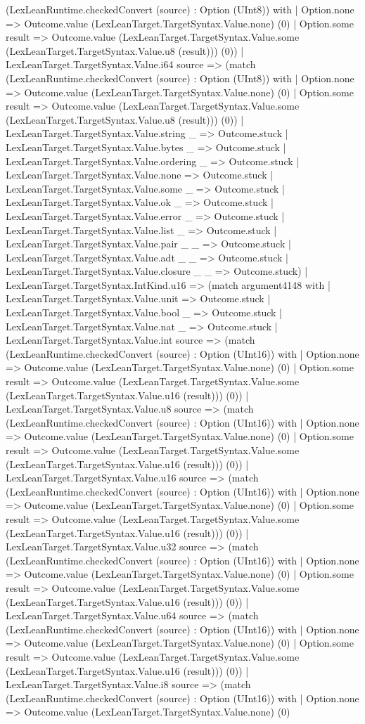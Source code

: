 \documentclass[11pt]{article}
\begin{document}
(LexLeanRuntime.checkedConvert (source) : Option (UInt8)) with | Option.none => Outcome.value (LexLeanTarget.TargetSyntax.Value.none) (0) | Option.some result => Outcome.value (LexLeanTarget.TargetSyntax.Value.some (LexLeanTarget.TargetSyntax.Value.u8 (result))) (0)) | LexLeanTarget.TargetSyntax.Value.i64 source => (match (LexLeanRuntime.checkedConvert (source) : Option (UInt8)) with | Option.none => Outcome.value (LexLeanTarget.TargetSyntax.Value.none) (0) | Option.some result => Outcome.value (LexLeanTarget.TargetSyntax.Value.some (LexLeanTarget.TargetSyntax.Value.u8 (result))) (0)) | LexLeanTarget.TargetSyntax.Value.string \_ => Outcome.stuck | LexLeanTarget.TargetSyntax.Value.bytes \_ => Outcome.stuck | LexLeanTarget.TargetSyntax.Value.ordering \_ => Outcome.stuck | LexLeanTarget.TargetSyntax.Value.none => Outcome.stuck | LexLeanTarget.TargetSyntax.Value.some \_ => Outcome.stuck | LexLeanTarget.TargetSyntax.Value.ok \_ => Outcome.stuck | LexLeanTarget.TargetSyntax.Value.error \_ => Outcome.stuck | LexLeanTarget.TargetSyntax.Value.list \_ => Outcome.stuck | LexLeanTarget.TargetSyntax.Value.pair \_ \_ => Outcome.stuck | LexLeanTarget.TargetSyntax.Value.adt \_ \_ => Outcome.stuck | LexLeanTarget.TargetSyntax.Value.closure \_ \_ => Outcome.stuck) | LexLeanTarget.TargetSyntax.IntKind.u16 => (match argument4148 with | LexLeanTarget.TargetSyntax.Value.unit => Outcome.stuck | LexLeanTarget.TargetSyntax.Value.bool \_ => Outcome.stuck | LexLeanTarget.TargetSyntax.Value.nat \_ => Outcome.stuck | LexLeanTarget.TargetSyntax.Value.int source => (match (LexLeanRuntime.checkedConvert (source) : Option (UInt16)) with | Option.none => Outcome.value (LexLeanTarget.TargetSyntax.Value.none) (0) | Option.some result => Outcome.value (LexLeanTarget.TargetSyntax.Value.some (LexLeanTarget.TargetSyntax.Value.u16 (result))) (0)) | LexLeanTarget.TargetSyntax.Value.u8 source => (match (LexLeanRuntime.checkedConvert (source) : Option (UInt16)) with | Option.none => Outcome.value (LexLeanTarget.TargetSyntax.Value.none) (0) | Option.some result => Outcome.value (LexLeanTarget.TargetSyntax.Value.some (LexLeanTarget.TargetSyntax.Value.u16 (result))) (0)) | LexLeanTarget.TargetSyntax.Value.u16 source => (match (LexLeanRuntime.checkedConvert (source) : Option (UInt16)) with | Option.none => Outcome.value (LexLeanTarget.TargetSyntax.Value.none) (0) | Option.some result => Outcome.value (LexLeanTarget.TargetSyntax.Value.some (LexLeanTarget.TargetSyntax.Value.u16 (result))) (0)) | LexLeanTarget.TargetSyntax.Value.u32 source => (match (LexLeanRuntime.checkedConvert (source) : Option (UInt16)) with | Option.none => Outcome.value (LexLeanTarget.TargetSyntax.Value.none) (0) | Option.some result => Outcome.value (LexLeanTarget.TargetSyntax.Value.some (LexLeanTarget.TargetSyntax.Value.u16 (result))) (0)) | LexLeanTarget.TargetSyntax.Value.u64 source => (match (LexLeanRuntime.checkedConvert (source) : Option (UInt16)) with | Option.none => Outcome.value (LexLeanTarget.TargetSyntax.Value.none) (0) | Option.some result => Outcome.value (LexLeanTarget.TargetSyntax.Value.some (LexLeanTarget.TargetSyntax.Value.u16 (result))) (0)) | LexLeanTarget.TargetSyntax.Value.i8 source => (match (LexLeanRuntime.checkedConvert (source) : Option (UInt16)) with | Option.none => Outcome.value (LexLeanTarget.TargetSyntax.Value.none) (0) 
\end{document}

